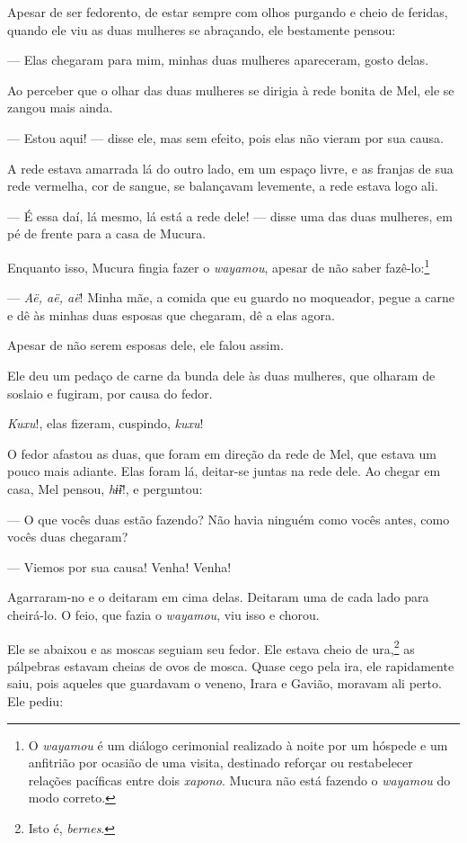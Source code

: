 Apesar de ser fedorento, de estar sempre com olhos purgando e cheio de
feridas, quando ele viu as duas mulheres se abraçando, ele bestamente
pensou:

--- Elas chegaram para mim, minhas duas mulheres apareceram, gosto
delas. 

Ao perceber que o olhar das duas mulheres se dirigia à rede bonita de
Mel, ele se zangou mais ainda. 

--- Estou aqui! --- disse ele, mas sem efeito, pois elas não vieram por
sua causa.

A rede estava amarrada lá do outro lado, em um espaço livre, e as
franjas de sua rede vermelha, cor de sangue, se balançavam levemente, a
rede estava logo ali. 

--- É essa daí, lá mesmo, lá está a rede dele! --- disse uma das duas
mulheres, em pé de frente para a casa de Mucura. 

Enquanto isso, Mucura fingia fazer o \textit{wayamou}, apesar de não saber
fazê-lo:\footnote{O \textit{wayamou} é um diálogo cerimonial realizado à noite por um hóspede e um anfitrião por ocasião de uma visita, destinado reforçar ou restabelecer relações pacíficas entre dois \textit{xapono}. Mucura não está fazendo o \textit{wayamou} do modo correto.} 

--- \textit{Aë, aë, aë}! Minha mãe, a comida que eu guardo no moqueador,
pegue a carne e dê às minhas duas esposas que chegaram, dê a elas
agora. 

Apesar de não serem esposas dele, ele falou assim. 

Ele deu um pedaço de carne da bunda dele às duas mulheres, que olharam
de soslaio e fugiram, por causa do fedor. 

\textit{Kuxu}!, elas fizeram, cuspindo, \textit{kuxu}!

O fedor afastou as duas, que foram em direção da rede de Mel, que estava um pouco mais adiante. Elas foram lá, deitar-se juntas na rede
dele. Ao chegar em casa, Mel pensou, \textit{hɨ̃ɨ}!, e perguntou:

--- O que vocês duas estão fazendo? Não havia ninguém como vocês antes,
como vocês duas chegaram?

--- Viemos por sua causa! Venha! Venha! 

Agarraram-no e o deitaram em cima delas. Deitaram uma de cada lado para
cheirá-lo. O feio, que fazia o \textit{wayamou}, viu isso e
chorou. 

Ele se abaixou e as moscas seguiam seu fedor. Ele estava cheio de
ura,\footnote{Isto é, \textit{bernes}.} as pálpebras estavam cheias de ovos de mosca.
Quase cego pela ira, ele rapidamente saiu, pois aqueles que guardavam o
veneno, Irara e Gavião, moravam ali perto. Ele pediu: 

